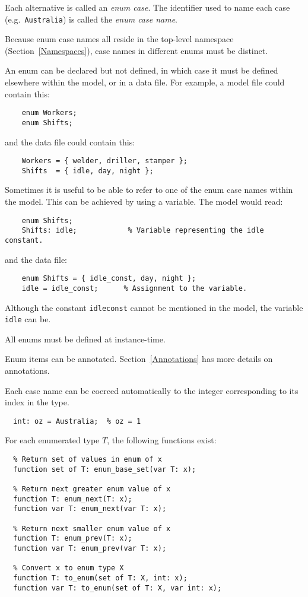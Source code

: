 \documentclass[10pt]{scrartcl}
\begin{document}
Each alternative is called an \emph{enum case}.  The identifier used to name
each case (e.g.~\texttt{Australia}) is
called the \emph{enum case name}.

Because enum case names all reside in the top-level namespace
(Section~\ref{Namespaces}), case names in different enums must be distinct.

An enum can be declared but not defined, in which case it must be defined
elsewhere within the model, or in a data file.
For example, a model file could contain this:
\begin{verbatim}
    enum Workers;
    enum Shifts;
\end{verbatim}
and the data file could contain this:
\begin{verbatim}
    Workers = { welder, driller, stamper };
    Shifts  = { idle, day, night };
\end{verbatim}
Sometimes it is useful to be able to refer to one of the enum case names
within the model.  This can be achieved by using a variable.  The model
would read:
\begin{verbatim}
    enum Shifts;
    Shifts: idle;            % Variable representing the idle constant.
\end{verbatim}
and the data file:
\begin{verbatim}
    enum Shifts = { idle_const, day, night };
    idle = idle_const;      % Assignment to the variable.
\end{verbatim}
Although the constant \texttt{idle\n{}const} cannot be mentioned in the
model, the variable \texttt{idle} can be.

All enums must be defined at instance-time.

Enum items can be annotated.
Section~\ref{Annotations} has more details on annotations.

Each case name can be coerced automatically to the integer corresponding to its index in the type.
\begin{verbatim}
  int: oz = Australia;  % oz = 1
\end{verbatim}

For each enumerated type $T$, the following functions exist:

\begin{verbatim}
  % Return set of values in enum of x
  function set of T: enum_base_set(var T: x);

  % Return next greater enum value of x
  function T: enum_next(T: x);
  function var T: enum_next(var T: x);
  
  % Return next smaller enum value of x
  function T: enum_prev(T: x);
  function var T: enum_prev(var T: x);

  % Convert x to enum type X
  function T: to_enum(set of T: X, int: x);
  function var T: to_enum(set of T: X, var int: x);
\end{verbatim}
\end{document}
